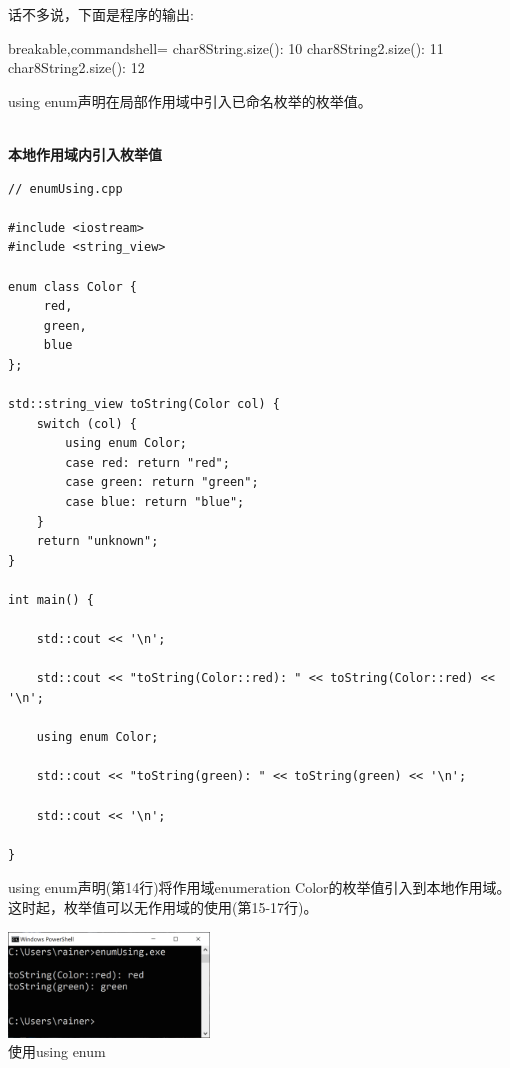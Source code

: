 话不多说，下面是程序的输出:

\begin{tcblisting}{breakable,commandshell={}}
char8String.size(): 10
char8String2.size(): 11
char8String2.size(): 12
\end{tcblisting}


using enum声明在局部作用域中引入已命名枚举的枚举值。

\hspace*{\fill} \\ %
\noindent
\textbf{本地作用域内引入枚举值}
\begin{lstlisting}[style=styleCXX]
// enumUsing.cpp

#include <iostream>
#include <string_view>

enum class Color {
	 red,
	 green,
	 blue
};

std::string_view toString(Color col) {
	switch (col) {
		using enum Color;
		case red: return "red";
		case green: return "green";
		case blue: return "blue";
	}
	return "unknown";
}

int main() {

	std::cout << '\n';
	
	std::cout << "toString(Color::red): " << toString(Color::red) << '\n';
	
	using enum Color;
	
	std::cout << "toString(green): " << toString(green) << '\n';
	
	std::cout << '\n';

}
\end{lstlisting}

using enum声明(第14行)将作用域enumeration Color的枚举值引入到本地作用域。这时起，枚举值可以无作用域的使用(第15-17行)。

\begin{center}
\includegraphics[width=0.4\textwidth]{content/3/chapter4/images/48.png}\\
使用using enum
\end{center}


